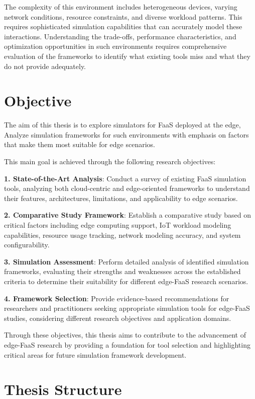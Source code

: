 The complexity of this environment includes heterogeneous devices, varying network conditions, resource constraints, and diverse workload patterns. This requires sophisticated simulation capabilities that can accurately model these interactions. Understanding the trade-offs, performance characteristics, and optimization opportunities in such environments requires comprehensive evaluation of the frameworks to identify what existing tools miss and what they do not provide adequately.

\section{Objective}

The aim of this thesis is to explore simulators for FaaS deployed at the edge, Analyze simulation frameworks for such environments with emphasis on factors that make them most suitable for edge scenarios.

This main goal is achieved through the following research objectives:

\textbf{1. State-of-the-Art Analysis}: Conduct a survey of existing FaaS simulation tools, analyzing both cloud-centric and edge-oriented frameworks to understand their features, architectures, limitations, and applicability to edge scenarios.

\textbf{2. Comparative Study Framework}: Establish a comparative study based on critical factors including edge computing support, IoT workload modeling capabilities, resource usage tracking, network modeling accuracy, and system configurability.

\textbf{3. Simulation Assessment}: Perform detailed analysis of identified simulation frameworks, evaluating their strengths and weaknesses across the established criteria to determine their suitability for different edge-FaaS research scenarios.

\textbf{4. Framework Selection}: Provide evidence-based recommendations for researchers and practitioners seeking appropriate simulation tools for edge-FaaS studies, considering different research objectives and application domains.

Through these objectives, this thesis aims to contribute to the advancement of edge-FaaS research by providing a foundation for tool selection and highlighting critical areas for future simulation framework development.

\section{Thesis Structure}

